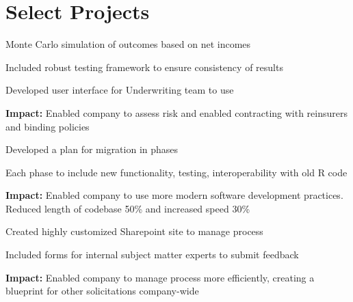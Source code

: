 \documentclass[]{deedy-resume-openfont}
\begin{document}
\begin{minipage}[t]{0.33\textwidth}



\section{Select Projects}
\vspace{\topsep}
\begin{tightemize}
\item Monte Carlo simulation of outcomes based on net incomes
\item Included robust testing framework to ensure consistency of results
\item Developed user interface for Underwriting team to use
\end{tightemize}
{\bf Impact: } Enabled company to assess risk and enabled contracting with reinsurers and binding policies
\\[6pt]
\begin{tightemize}
\item Developed a plan for migration in phases
\item Each phase to include new functionality, testing, interoperability with old R code
\end{tightemize}
{\bf Impact: } Enabled company to use more modern software development practices. Reduced length of codebase 50\% and increased speed 30\%
\\[6pt]
\begin{tightemize}
\item Created highly customized Sharepoint site to manage process
\item Included forms for internal subject matter experts to submit feedback
\end{tightemize}
{\bf Impact: } Enabled company to manage process more efficiently, creating a blueprint for other solicitations company-wide

\end{minipage} 
\end{document}
